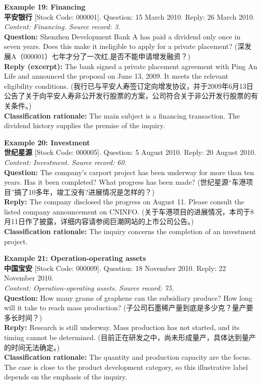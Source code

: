 \vspace{0.4cm}
\noindent \textbf{Example 19: Financing} \\
\textbf{平安银行} [Stock Code: 000001]. Question: 15 March 2010. Reply: 26 March 2010. \\
\textit{Content: Financing. Source record: 3.} \\
\textbf{Question:} Shenzhen Development Bank A has paid a dividend only once in seven years. Does this make it ineligible to apply for a private placement? (深发展A（000001）七年才分了一次红,是否不能申请增发融资？) \\
\textbf{Reply (excerpt):} The bank signed a private placement agreement with Ping An Life and announced the proposal on June 13, 2009. It meets the relevant eligibility conditions. (我行已与平安人寿签订定向增发协议，并于2009年6月13日公告了关于向平安人寿非公开发行股票的方案，公司符合关于非公开发行股票的有关条件。) \\
\textbf{Classification rationale:} The main subject is a financing transaction. The dividend history supplies the premise of the inquiry.

\clearpage
\noindent \textbf{Example 20: Investment} \\
\textbf{世纪星源} [Stock Code: 000005]. Question: 5 August 2010. Reply: 20 August 2010. \\
\textit{Content: Investment. Source record: 60.} \\
\textbf{Question:} The company's carport project has been underway for more than ten years. Has it been completed? What progress has been made? (世纪星源“车港项目”搞了10多年，竣工没有?进展情况是怎样的？) \\
\textbf{Reply:} The company disclosed the progress on August 11. Please consult the listed company announcement on CNINFO. (关于车港项目的进展情况，本司于8月11日作了披露，详细内容请参阅巨潮网站的上市公司公告。) \\
\textbf{Classification rationale:} The inquiry concerns the completion of an investment project.

\vspace{0.4cm}
\noindent \textbf{Example 21: Operation-operating assets} \\
\textbf{中国宝安} [Stock Code: 000009]. Question: 18 November 2010. Reply: 22 November 2010. \\
\textit{Content: Operation-operating assets. Source record: 75.} \\
\textbf{Question:} How many grams of graphene can the subsidiary produce? How long will it take to reach mass production? (子公司石墨稀产量到底是多少克？量产要多长时间？) \\
\textbf{Reply:} Research is still underway. Mass production has not started, and its timing cannot be determined. (目前正在研发之中，尚未形成量产，具体达到量产的时间无法确定。) \\
\textbf{Classification rationale:} The quantity and production capacity are the focus. The case is close to the product development category, so this illustrative label depends on the emphasis of the inquiry.

